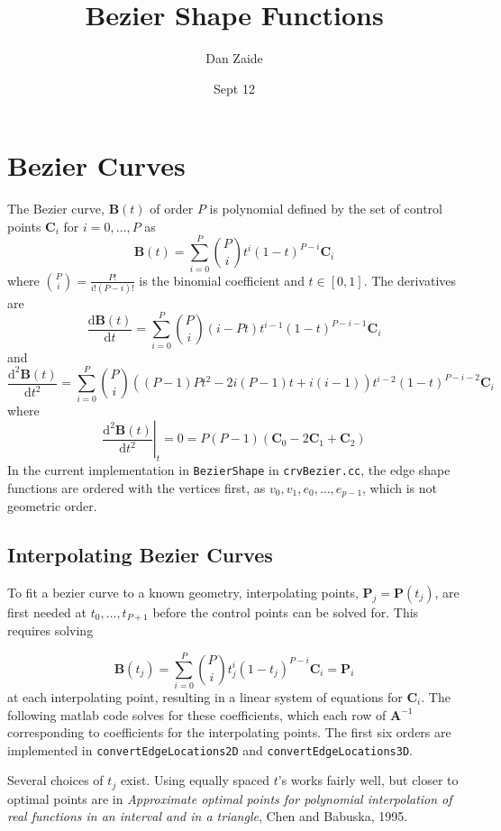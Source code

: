 \documentclass{article}
\title{Bezier Shape Functions}
\author{Dan Zaide}
\date{Sept 12}
\begin{document}
\maketitle

\section{Bezier Curves}
The Bezier curve, $\mathbf{B}(t)$ of order $P$ is polynomial defined by the set of control points $\mathbf{C}_i$ for $i = 0,\ldots,P$ as 
\[
\mathbf{B}(t) = \displaystyle \sum_{i=0}^P {P \choose i}t^i(1-t)^{P-i}\mathbf{C}_i
\]
where ${P \choose i}= \frac{P!}{i!(P-i)!}$ is the binomial coefficient and $ t \in [0,1]$. The derivatives are
\[
\frac{\mathrm{d} \mathbf{B}(t)}{\mathrm{d} t} = \displaystyle \sum_{i=0}^P {P \choose i}(i-Pt)t^{i-1}(1-t)^{P-i-1}\mathbf{C}_i
\]
and
\[
\frac{\mathrm{d}^2 \mathbf{B}(t)}{\mathrm{d} t^2} = \displaystyle \sum_{i=0}^P {P \choose i}((P-1)Pt^2-2i(P-1)t+i(i-1))t^{i-2}(1-t)^{P-i-2}\mathbf{C}_i
\]
where
\[\left.\frac{\mathrm{d}^2 \mathbf{B}(t)}{\mathrm{d} t^2}\right|_t=0 = P(P-1)(\mathbf{C}_0-2\mathbf{C}_1+\mathbf{C}_2)\]
In the current implementation in \texttt{BezierShape} in \texttt{crvBezier.cc}, the edge shape functions are ordered with the vertices first, as $v_0,v_1,e_0,\ldots,e_{p-1}$, which is not geometric order.
\subsection{Interpolating Bezier Curves}
To fit a bezier curve to a known geometry, interpolating points, $\mathbf{P}_j = \mathbf{P}(t_j)$, are first needed at $t_0,\ldots, t_{P+1}$ before the control points can be solved for. This requires solving

\[
\mathbf{B}(t_j) = \displaystyle \sum_{i=0}^P {P \choose i}t_j^i(1-t_j)^{P-i}\mathbf{C}_i = \mathbf{P}_i
\]
at each interpolating point, resulting in a linear system of equations for $\mathbf{C}_i$. The following matlab code solves for these coefficients, which each row of $\mathbf{A}^{-1}$ corresponding to coefficients for the interpolating points. The first six orders are implemented in \texttt{convertEdgeLocations2D} and \texttt{convertEdgeLocations3D}.

Several choices of $t_j$ exist. Using equally spaced $t$'s works fairly well, but closer to optimal points are in \textit{Approximate optimal points for polynomial interpolation of real functions in an interval and in a triangle}, Chen and Babuska, 1995.
\end{document}
